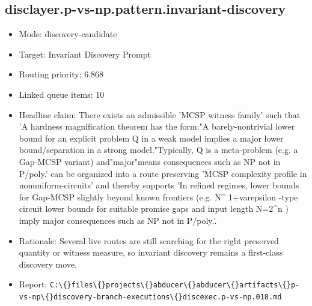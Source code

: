 \documentclass[11pt]{article}
\begin{document}
\subsection*{disclayer.p-vs-np.pattern.invariant-discovery}
\begin{itemize}
\item Mode: discovery-candidate
\item Target: Invariant Discovery Prompt
\item Routing priority: 6.868
\item Linked queue items: 10
\item Headline claim: There exists an admissible 'MCSP witness family' such that 'A hardness magnification theorem has the form:"A barely-nontrivial lower bound for an explicit problem Q in a weak model implies a major lower bound/separation in a strong model."Typically, Q is a meta-problem (e.g. a Gap-MCSP variant) and"major"means consequences such as NP not in P/poly.' can be organized into a route preserving 'MCSP complexity profile in nonuniform-circuits' and thereby supports 'In refined regimes, lower bounds for Gap-MCSP slightly beyond known frontiers (e.g. N\textasciicircum{} 1+varepsilon -type circuit lower bounds for suitable promise gaps and input length N=2\textasciicircum{}n ) imply major consequences such as NP not in P/poly.'.
\item Rationale: Several live routes are still searching for the right preserved quantity or witness measure, so invariant discovery remains a first-class discovery move.
\item Report: \texttt{C:\textbackslash\{\}files\textbackslash\{\}projects\textbackslash\{\}abducer\textbackslash\{\}abducer\textbackslash\{\}artifacts\textbackslash\{\}p-vs-np\textbackslash\{\}discovery-branch-executions\textbackslash\{\}discexec.p-vs-np.018.md}
\end{itemize}
\end{document}
